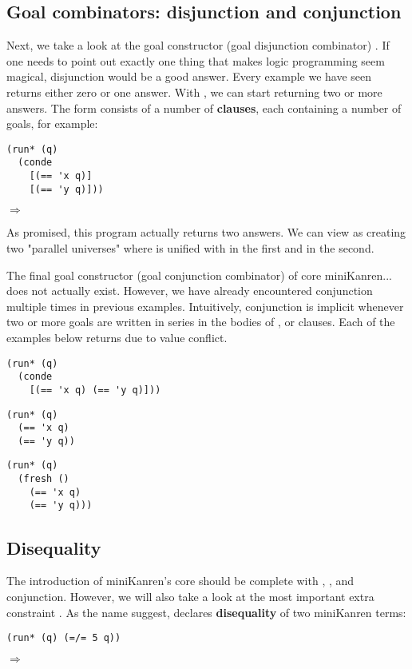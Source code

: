 \subsection{Goal combinators: disjunction and conjunction}
Next, we take a look at the goal constructor (goal disjunction combinator) .
If one needs to point out exactly one thing that makes logic programming seem magical, disjunction would be a good answer. Every example we have seen returns either zero or one answer. With , we can start returning two or more answers. The  form consists of a number of \textbf{clauses}, each containing a number of goals, for example:

\begin{lstlisting}
(run* (q)
  (conde
    [(== 'x q)]
    [(== 'y q)]))
\end{lstlisting}
$\Rightarrow$ 

As promised, this program actually returns two answers. We can view  as creating two "parallel universes" where  is unified with  in the first and  in the second.

The final goal constructor (goal conjunction combinator) of core miniKanren... does not actually exist. However, we have already encountered conjunction multiple times in previous examples. Intuitively, conjunction is implicit whenever two or more goals are written in series in the bodies of ,  or  clauses. Each of the examples below returns \code{()} due to value conflict.
\begin{lstlisting}
(run* (q)
  (conde
    [(== 'x q) (== 'y q)]))
\end{lstlisting}

\begin{lstlisting}
(run* (q)
  (== 'x q)
  (== 'y q))
\end{lstlisting}

\begin{lstlisting}
(run* (q)
  (fresh ()
    (== 'x q)
    (== 'y q)))
\end{lstlisting}

\subsection{Disequality}
The introduction of miniKanren's core should be complete with \code{==}, ,  and conjunction. However, we will also take a look at the most important extra constraint \code{=/=}. As the name suggest, \code{=/=} declares \textbf{disequality} of two miniKanren terms:
\begin{lstlisting}
(run* (q) (=/= 5 q))
\end{lstlisting}
$\Rightarrow$ 

